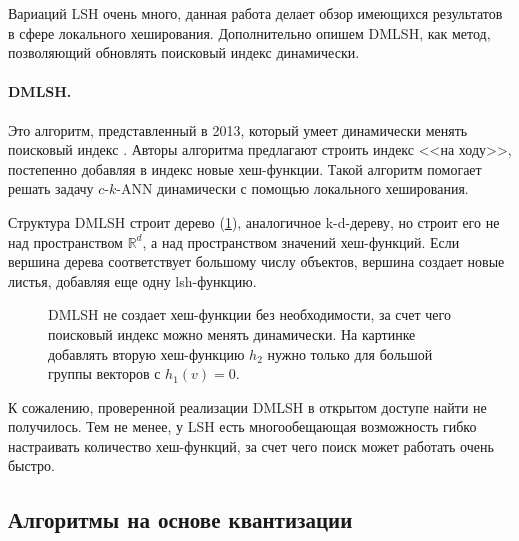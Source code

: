 \documentclass[a4paper,12pt]{extarticle}
\begin{document}
Вариаций LSH очень много, данная работа \cite{jafari2021survey} делает обзор имеющихся результатов в сфере локального хеширования. Дополнительно опишем DMLSH, как метод, позволяющий обновлять поисковый индекс динамически.

\paragraph{DMLSH.}
Это алгоритм, представленный в 2013, который умеет динамически менять поисковый индекс \cite{yin2013dynamic}. Авторы алгоритма предлагают строить индекс <<на ходу>>, постепенно добавляя в индекс новые хеш-функции. Такой алгоритм помогает решать задачу $c$-$k$-ANN динамически с помощью локального хеширования.

Структура DMLSH строит дерево (\cref{ris:dmlsh}), аналогичное k-d-дереву, но строит его не над пространством $\mathbb{R}^d$, а над пространством значений хеш-функций. Если вершина дерева соответствует большому числу объектов, вершина создает новые листья, добавляя еще одну lsh-функцию. 

\begin{center}
\begin{figure}[H]
\caption{DMLSH не создает хеш-функции без необходимости, за счет чего поисковый индекс можно менять динамически. На картинке добавлять вторую хеш-функцию $h_2$ нужно только для большой группы векторов с $h_1(v) = 0$.}
\label{ris:dmlsh}
\end{figure}
\end{center}

К сожалению, проверенной реализации DMLSH в открытом доступе найти не получилось. Тем не менее, у LSH есть многообещающая возможность гибко настраивать количество хеш-функций, за счет чего поиск может работать очень быстро.

\subsection{Алгоритмы на основе квантизации}
\end{document}
